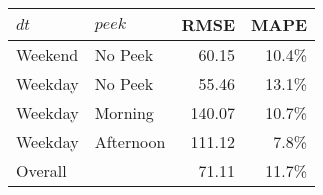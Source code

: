 \begin{tabular}{llrr}
 $\mathit{dt}$ & $\mathit{peek}$ & RMSE & MAPE \\ 
  \hline
\hline
Weekend & No Peek & 60.15 & 10.4\% \\ 
   \hline
Weekday & No Peek & 55.46 & 13.1\% \\ 
   \hline
Weekday & Morning & 140.07 & 10.7\% \\ 
   \hline
Weekday & Afternoon & 111.12 & 7.8\% \\ 
   \hline
\hline
Overall &  & 71.11 & 11.7\% \\ 
  \end{tabular}
